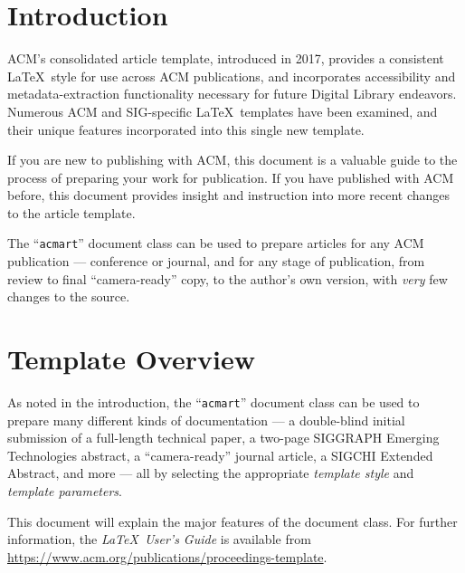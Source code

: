 \documentclass[sigconf]{acmart}
\begin{document}

\maketitle

\section{Introduction}
ACM's consolidated article template, introduced in 2017, provides a
consistent \LaTeX\ style for use across ACM publications, and
incorporates accessibility and metadata-extraction functionality
necessary for future Digital Library endeavors. Numerous ACM and
SIG-specific \LaTeX\ templates have been examined, and their unique
features incorporated into this single new template.

If you are new to publishing with ACM, this document is a valuable
guide to the process of preparing your work for publication. If you
have published with ACM before, this document provides insight and
instruction into more recent changes to the article template.

The ``\verb|acmart|'' document class can be used to prepare articles
for any ACM publication --- conference or journal, and for any stage
of publication, from review to final ``camera-ready'' copy, to the
author's own version, with {\itshape very} few changes to the source.

\section{Template Overview}
As noted in the introduction, the ``\verb|acmart|'' document class can
be used to prepare many different kinds of documentation --- a
double-blind initial submission of a full-length technical paper, a
two-page SIGGRAPH Emerging Technologies abstract, a ``camera-ready''
journal article, a SIGCHI Extended Abstract, and more --- all by
selecting the appropriate {\itshape template style} and {\itshape
  template parameters}.

This document will explain the major features of the document
class. For further information, the {\itshape \LaTeX\ User's Guide} is
available from
\url{https://www.acm.org/publications/proceedings-template}.
\end{document}

